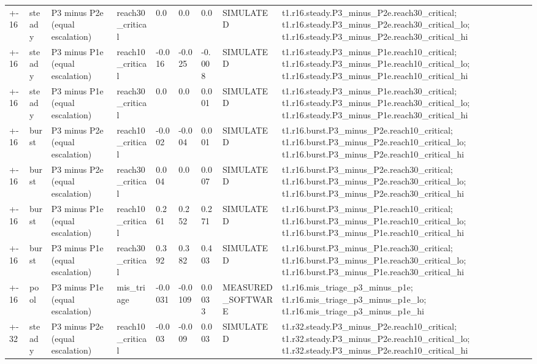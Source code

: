 \begin{table}[t]
\begin{tabular}{lllllllll}
+-16 & steady & P3 minus P2e (equal escalation) & reach30\_critical & 0.0 & 0.0 & 0.0 & SIMULATED & t1.r16.steady.P3\_minus\_P2e.reach30\_critical; t1.r16.steady.P3\_minus\_P2e.reach30\_critical\_lo; t1.r16.steady.P3\_minus\_P2e.reach30\_critical\_hi \\
+-16 & steady & P3 minus P1e (equal escalation) & reach10\_critical & -0.016 & -0.025 & -0.008 & SIMULATED & t1.r16.steady.P3\_minus\_P1e.reach10\_critical; t1.r16.steady.P3\_minus\_P1e.reach10\_critical\_lo; t1.r16.steady.P3\_minus\_P1e.reach10\_critical\_hi \\
+-16 & steady & P3 minus P1e (equal escalation) & reach30\_critical & 0.0 & 0.0 & 0.001 & SIMULATED & t1.r16.steady.P3\_minus\_P1e.reach30\_critical; t1.r16.steady.P3\_minus\_P1e.reach30\_critical\_lo; t1.r16.steady.P3\_minus\_P1e.reach30\_critical\_hi \\
+-16 & burst & P3 minus P2e (equal escalation) & reach10\_critical & -0.002 & -0.004 & 0.001 & SIMULATED & t1.r16.burst.P3\_minus\_P2e.reach10\_critical; t1.r16.burst.P3\_minus\_P2e.reach10\_critical\_lo; t1.r16.burst.P3\_minus\_P2e.reach10\_critical\_hi \\
+-16 & burst & P3 minus P2e (equal escalation) & reach30\_critical & 0.004 & 0.0 & 0.007 & SIMULATED & t1.r16.burst.P3\_minus\_P2e.reach30\_critical; t1.r16.burst.P3\_minus\_P2e.reach30\_critical\_lo; t1.r16.burst.P3\_minus\_P2e.reach30\_critical\_hi \\
+-16 & burst & P3 minus P1e (equal escalation) & reach10\_critical & 0.261 & 0.252 & 0.271 & SIMULATED & t1.r16.burst.P3\_minus\_P1e.reach10\_critical; t1.r16.burst.P3\_minus\_P1e.reach10\_critical\_lo; t1.r16.burst.P3\_minus\_P1e.reach10\_critical\_hi \\
+-16 & burst & P3 minus P1e (equal escalation) & reach30\_critical & 0.392 & 0.382 & 0.403 & SIMULATED & t1.r16.burst.P3\_minus\_P1e.reach30\_critical; t1.r16.burst.P3\_minus\_P1e.reach30\_critical\_lo; t1.r16.burst.P3\_minus\_P1e.reach30\_critical\_hi \\
+-16 & pool & P3 minus P1e (equal escalation) & mis\_triage & -0.0031 & -0.0109 & 0.0033 & MEASURED\_SOFTWARE & t1.r16.mis\_triage\_p3\_minus\_p1e; t1.r16.mis\_triage\_p3\_minus\_p1e\_lo; t1.r16.mis\_triage\_p3\_minus\_p1e\_hi \\
+-32 & steady & P3 minus P2e (equal escalation) & reach10\_critical & -0.003 & -0.009 & 0.003 & SIMULATED & t1.r32.steady.P3\_minus\_P2e.reach10\_critical; t1.r32.steady.P3\_minus\_P2e.reach10\_critical\_lo; t1.r32.steady.P3\_minus\_P2e.reach10\_critical\_hi \\

\end{tabular}
\end{table}
